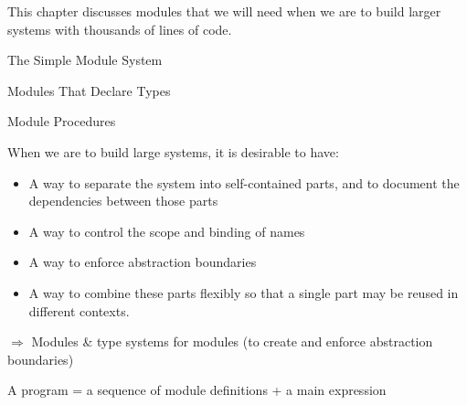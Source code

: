 \documentclass{article}
\begin{document}
\begin{huge}

\sf


This chapter discusses modules that we will need when we are to build larger systems with thousands of lines of code.

\blob The Simple Module System

\blob Modules That Declare Types

\blob Module Procedures


When we are to build large systems, it is desirable to have:

\begin{itemize}
\item A way to separate the system into self-contained parts, and to document the dependencies between those parts
\item A way to control the scope and binding of names 
\item A way to enforce abstraction boundaries 
\item A way to combine these parts flexibly so that a single part may be reused in different contexts.
\end{itemize}

$\Rightarrow$ Modules \& type systems for modules (to create and enforce abstraction boundaries)


A program = a sequence of module definitions + a main expression


\end{huge}
\end{document}
